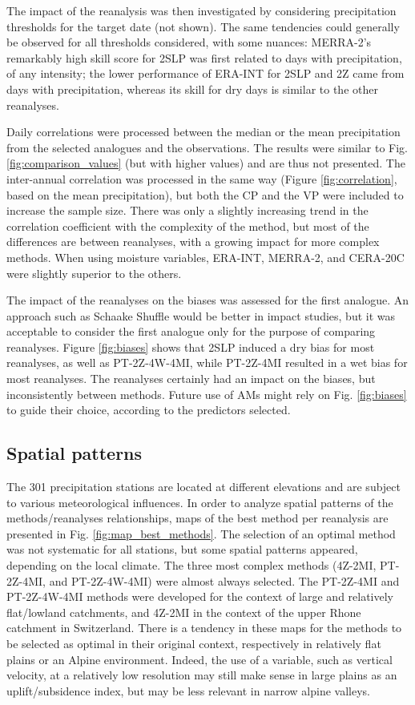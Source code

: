 \documentclass[smallextended]{svjour3}       %
\begin{document}
	The impact of the reanalysis was then investigated by considering precipitation thresholds for the target date (not shown). The same tendencies could generally be observed for all thresholds considered, with some nuances: MERRA-2's remarkably high skill score for 2SLP was first related to days with precipitation, of any intensity; the lower performance of ERA-INT for 2SLP and 2Z came from days with precipitation, whereas its skill for dry days is similar to the other reanalyses.
	
	Daily correlations were processed between the median or the mean precipitation from the selected analogues and the observations. The results were similar to Fig. \ref{fig:comparison_values} (but with higher values) and are thus not presented. The inter-annual correlation was processed in the same way (Figure \ref{fig:correlation}, based on the mean precipitation), but both the CP and the VP were included to increase the sample size. There was only a slightly increasing trend in the correlation coefficient with the complexity of the method, but most of the differences are between reanalyses, with a growing impact for more complex methods. When using moisture variables, ERA-INT, MERRA-2, and CERA-20C were slightly superior to the others.
	
	The impact of the reanalyses on the biases was assessed for the first analogue. An approach such as Schaake Shuffle \citep{Clark2004a} would be better in impact studies, but it was acceptable to consider the first analogue only for the purpose of comparing reanalyses. Figure \ref{fig:biases} shows that 2SLP induced a dry bias for most reanalyses, as well as PT-2Z-4W-4MI, while PT-2Z-4MI resulted in a wet bias for most reanalyses. The reanalyses certainly had an impact on the biases, but inconsistently between methods. Future use of AMs might rely on Fig. \ref{fig:biases} to guide their choice, according to the predictors selected.
	
	
	\subsection{Spatial patterns}
	
	The 301 precipitation stations are located at different elevations and are subject to various meteorological influences. In order to analyze spatial patterns of the methods/reanalyses relationships, maps of the best method per reanalysis are presented in Fig. \ref{fig:map_best_methods}. The selection of an optimal method was not systematic for all stations, but some spatial patterns appeared, depending on the local climate. The three most complex methods (4Z-2MI, PT-2Z-4MI, and PT-2Z-4W-4MI) were almost always selected. The PT-2Z-4MI and PT-2Z-4W-4MI methods were developed for the context of large and relatively flat/lowland catchments, and 4Z-2MI in the context of the upper Rhone catchment in Switzerland. There is a tendency in these maps for the methods to be selected as optimal in their original context, respectively in relatively flat plains or an Alpine environment. Indeed, the use of a variable, such as vertical velocity, at a relatively low resolution may still make sense in large plains as an uplift/subsidence index, but may be less relevant in narrow alpine valleys.
	
\end{document}
